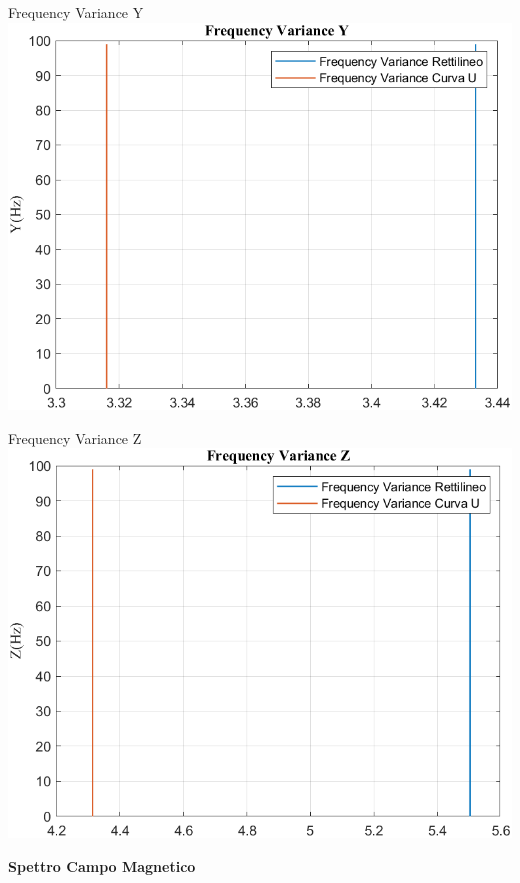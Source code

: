 \documentclass[beamer]{standalone}
\begin{document}
	\begin{frame}{{Frequency Variance Y}}
		\centering\includegraphics[height=.8\textheight]{figure/Mag/Trasformata/Frequency VarianceY}
	\end{frame}
	
	\begin{frame}{{Frequency Variance Z}}
		\centering\includegraphics[height=.8\textheight]{figure/Mag/Trasformata/Frequency VarianceZ}
	\end{frame}
	
	\begin{frame}
		\color{blue}\centering\huge{\textbf{Spettro Campo Magnetico}}
	\end{frame}
	
\end{document}
